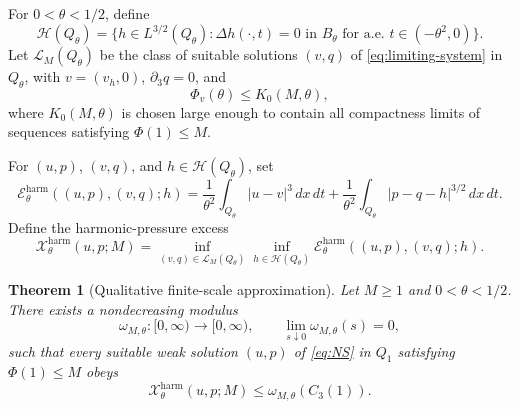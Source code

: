 \documentclass[pdflatex,sn-mathphys-num]{sn-jnl}
\numberwithin{equation}{section}
\theoremstyle{thmstyleone}
\newtheorem{theorem}{Theorem}[section]
\theoremstyle{thmstylethree}
\newcommand{\dxdt}{\,dx\,dt}
\newcommand{\calH}{\mathcal H}
\newcommand{\calL}{\mathcal L}
\newcommand{\calE}{\mathcal E}
\newcommand{\calX}{\mathcal X}
\newcommand{\harm}{\mathrm{harm}}
\begin{document}
For \(0<\theta<1/2\), define
\[
        \calH(Q_\theta)=\{h\in L^{3/2}(Q_\theta):\Delta h(\cdot,t)=0\text{ in }B_\theta\text{ for a.e. }t\in(-\theta^2,0)\}.
\]
Let \(\calL_M(Q_\theta)\) be the class of suitable solutions \((v,q)\) of \eqref{eq:limiting-system} in \(Q_\theta\), with \(v=(v_h,0)\), \(\partial_3q=0\), and
\[
        \Phi_v(\theta)\le K_0(M,\theta),
\]
where \(K_0(M,\theta)\) is chosen large enough to contain all compactness limits of sequences satisfying \(\Phi(1)\le M\).

For \((u,p)\), \((v,q)\), and \(h\in\calH(Q_\theta)\), set
\[
\calE^{\harm}_\theta((u,p),(v,q);h)
=\frac1{\theta^2}\int_{Q_\theta}|u-v|^3\dxdt
+\frac1{\theta^2}\int_{Q_\theta}|p-q-h|^{3/2}\dxdt.
\]
Define the harmonic-pressure excess
\begin{equation}
\calX^{\harm}_\theta(u,p;M)
=\inf_{(v,q)\in\calL_M(Q_\theta)}\inf_{h\in\calH(Q_\theta)}
\calE^{\harm}_\theta((u,p),(v,q);h).
\label{eq:harmonic-excess}
\end{equation}

\begin{theorem}[Qualitative finite-scale approximation]
\label{thm:qualitative-approx}
Let \(M\ge1\) and \(0<\theta<1/2\).  There exists a nondecreasing modulus
\[
        \omega_{M,\theta}:[0,\infty)\to[0,\infty),
        \qquad
        \lim_{s\downarrow0}\omega_{M,\theta}(s)=0,
\]
such that every suitable weak solution \((u,p)\) of \eqref{eq:NS} in \(Q_1\) satisfying \(\Phi(1)\le M\) obeys
\begin{equation}
        \calX^{\harm}_\theta(u,p;M)
        \le \omega_{M,\theta}(C_3(1)).
        \label{eq:qualitative-approx}
\end{equation}
\end{theorem}
\end{document}
